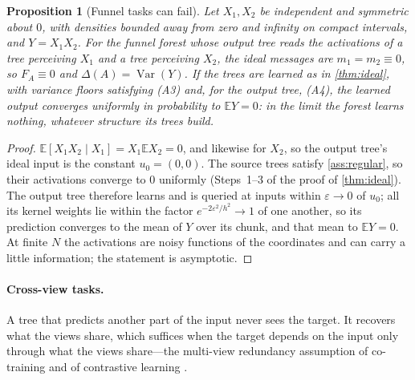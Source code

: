 \documentclass[11pt]{article}
\newtheorem{proposition}[theorem]{Proposition}
\theoremstyle{definition}
\theoremstyle{remark}
\newcommand{\E}{\mathbb{E}}
\newcommand{\Var}{\operatorname{Var}}
\begin{document}
\begin{proposition}[Funnel tasks can fail]\label{prop:xy}
Let $X_1,X_2$ be independent and symmetric about $0$, with densities bounded away from
zero and infinity on compact intervals, and $Y=X_1X_2$.  For the funnel forest whose output tree reads
the activations of a tree perceiving $X_1$ and a tree perceiving $X_2$, the ideal
messages are $m_1=m_2\equiv0$, so $F_A\equiv0$ and $\Delta(A)=\Var(Y)$.  If the trees are
learned as in \cref{thm:ideal}, with variance floors satisfying (A3) and, for the output
tree, (A4),
the learned output converges uniformly in probability to $\E Y=0$: in the limit the
forest learns nothing, whatever structure its trees build.
\end{proposition}
\begin{proof}
$\E[X_1X_2\mid X_1]=X_1\E X_2=0$, and likewise for $X_2$, so the output tree's ideal input
is the constant $u_0=(0,0)$.  The source trees satisfy \cref{ass:regular}, so their
activations converge to $0$ uniformly (Steps~1--3 of the proof of \cref{thm:ideal}).  The
output tree therefore learns and is queried at inputs within $\varepsilon\to0$ of $u_0$;
all its kernel weights lie within the factor $e^{-2\varepsilon^2/h^2}\to1$ of one another,
so its prediction converges to the mean of $Y$ over its chunk, and that mean to $\E Y=0$.
At finite $N$ the activations are noisy functions of the coordinates and can carry a
little information; the statement is asymptotic.
\end{proof}

\paragraph{Cross-view tasks.}
A tree that predicts another part of the input never sees the target.  It recovers what
the views share, which suffices when the target depends on the input only through what
the views share---the multi-view redundancy assumption of co-training and of
contrastive learning \citep{blum1998,tosh2021}.
\end{document}
